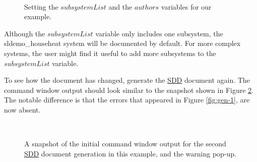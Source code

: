 \documentclass{mcscert}
\begin{document}
\begin{figure}
	\caption{Setting the $subsystemList$ and the $authors$ variables for our example.}
	\centering
	\label{fig:config-2}
	\\
\end{figure}

Although the $subsystemList$ variable only includes one subsystem, the sldemo\_househeat system will be documented by default. 
For more complex
systems, the user might find it useful to add more subsystems to the $subsystemList$ variable.

To see how the document has changed, generate the \hyperref[acr:sdd]{SDD} document again. 
The command window output should look similar to the snapshot shown in Figure \ref{fig:gen-2}. 
The notable difference is that the errors that appeared in Figure \ref{fig:gen-1}, are now absent.

\begin{figure}
	\caption{A snapshot of the initial command window output for the second \hyperref[acr:sdd]{SDD}	document generation in this example, and the warning pop-up.}
	\centering
	\label{fig:gen-2}
	\\
\end{figure}
\end{document}
